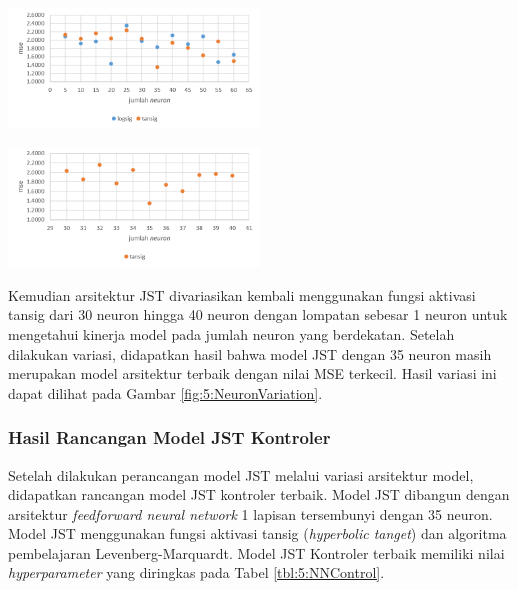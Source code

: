 \documentclass[a4paper,10pt]{article}
\makeatletter
\newenvironment{body}{\begin{multicols}{2}}{\end{multicols}}
\renewenvironment{figure}
{\def\@captype{figure}%
	\captionsetup{labelsep=period,format=hang,font=footnotesize,justification=justified}
}
{}
\makeatother
\begin{document}
\begin{body}
		\begin{figure}
			\centering
			\includegraphics[width=0.5\textwidth]{figures/ActivationVariation}
			\caption{Grafik Persebaran MSE Variasi Arsitektur JST Kontroler}
			\label{fig:5:ActivationVariation}
		\end{figure}
		
		\begin{figure}
			\centering
			\includegraphics[width=0.5\textwidth]{figures/NeuronVariation}
			\caption{Grafik Persebaran MSE Variasi Arsitektur JST Kontroler}
			\label{fig:5:NeuronVariation}
		\end{figure}
		\vspace{1em}
		
		Kemudian arsitektur JST divariasikan kembali menggunakan fungsi aktivasi tansig dari 30 neuron hingga 40 neuron dengan lompatan sebesar 1 neuron untuk mengetahui kinerja model pada jumlah neuron yang berdekatan. Setelah dilakukan variasi, didapatkan hasil bahwa model JST dengan 35 neuron masih merupakan model arsitektur terbaik dengan nilai MSE terkecil. Hasil variasi ini dapat dilihat pada Gambar \ref{fig:5:NeuronVariation}.
		
		\subsubsection{Hasil Rancangan Model JST Kontroler}
		Setelah dilakukan perancangan model JST melalui variasi arsitektur model, didapatkan rancangan model JST kontroler terbaik. Model JST dibangun dengan arsitektur \textit{feedforward neural network} 1 lapisan tersembunyi dengan 35 neuron. Model JST menggunakan fungsi aktivasi tansig (\textit{hyperbolic tanget}) dan algoritma pembelajaran Levenberg-Marquardt. Model JST Kontroler terbaik memiliki nilai \textit{hyperparameter} yang diringkas pada Tabel \ref{tbl:5:NNControl}.
		

\end{body}
\end{document}

